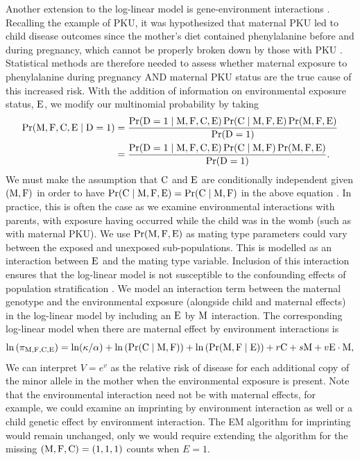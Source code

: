 Another extension to the log-linear model is gene-environment interactions \cite{Huds19}.
Recalling the example of PKU, it was hypothesized that maternal PKU led to child disease outcomes since the mother's diet contained phenylalanine before and during pregnancy, which cannot be properly broken down by those with PKU \cite{Lee+05}.
Statistical methods are therefore needed to assess whether maternal exposure to phenylalanine during pregnancy AND maternal PKU status are the true cause of this increased risk.
With the addition of information on environmental exposure status, ${\rm E}$, we modify our multinomial probability by taking
\begin{align*}
    \Pr({\rm M}, {\rm F}, {\rm C}, {\rm E} \mid {\rm D} = 1) &= \frac{\Pr({\rm D} = 1 \mid {\rm M}, {\rm F}, {\rm C}, {\rm E}) \Pr({\rm C} \mid {\rm M}, {\rm F}, {\rm E}) \Pr({\rm M}, {\rm F}, {\rm E})}{\Pr({\rm D} = 1)} \\
                                         &= \frac{\Pr({\rm D} = 1 \mid {\rm M}, {\rm F}, {\rm C}, {\rm E}) \Pr({\rm C} \mid {\rm M}, {\rm F}) \Pr({\rm M}, {\rm F}, {\rm E})}{\Pr({\rm D} = 1)}.
\end{align*}
We must make the assumption that ${\rm C}$ and ${\rm E}$ are conditionally independent given $({\rm M}, {\rm F})$ in order to have $\Pr({\rm C} \mid {\rm M}, {\rm F}, {\rm E}) = \Pr({\rm C} \mid {\rm M}, {\rm F})$ in the above equation \cite{UmbaWein00}.
In practice, this is often the case as we examine environmental interactions with parents, with exposure having occurred while the child was in the womb (such as with maternal PKU).
We use $\Pr({\rm M}, {\rm F}, {\rm E})$ as mating type parameters could vary between the exposed and unexposed sub-populations.
This is modelled as an interaction between ${\rm E}$ and the mating type variable.
Inclusion of this interaction ensures that the log-linear model is not susceptible to the confounding effects of population stratification \cite{Shin+10}.
We model an interaction term between the maternal genotype and the environmental exposure (alongside child and maternal effects) in the log-linear model by including an ${\rm E}$ by ${\rm M}$ interaction.
The corresponding log-linear model when there are maternal effect by environment interactions is
\begin{equation*}
    \ln\left(\pi_{{\rm M}, {\rm F}, {\rm C}, {\rm E}}\right) = \ln(\kappa/\alpha) + \ln\left(\Pr({\rm C} \mid {\rm M}, {\rm F})\right) + \ln\left(\Pr({\rm M}, {\rm F} \mid {\rm E})\right) + r {\rm C} + s {\rm M} + v {\rm E}\cdot {\rm M},
\end{equation*}
We can interpret $V = e^v$ as the relative risk of disease for each additional copy of the minor allele in the mother when the environmental exposure is present.
Note that the environmental interaction need not be with maternal effects, for example, we could examine an imprinting by environment interaction as well or a child genetic effect by environment interaction.
The EM algorithm for imprinting would remain unchanged, only we would require extending the algorithm for the missing $({\rm M},{\rm F},{\rm C}) = (1,1,1)$ counts when $E = 1$.

